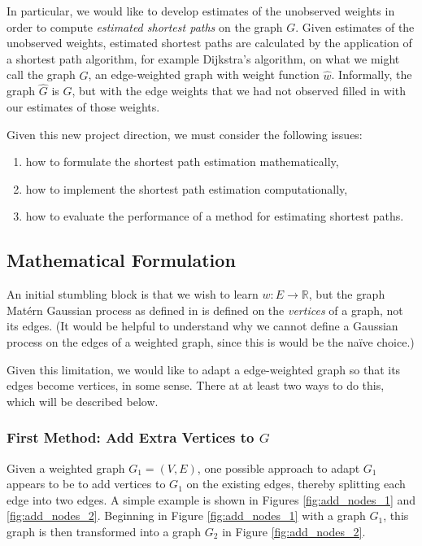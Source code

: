 In particular, we would like to develop estimates of the unobserved weights in order to compute \textit{estimated shortest paths} on the graph $G$. Given estimates of the unobserved weights, estimated shortest paths are calculated by the application of a shortest path algorithm, for example Dijkstra's algorithm, on what we might call the graph $\hat G$, an edge-weighted graph with weight function $\hat w$. Informally, the graph $\hat G$ is $G$, but with the edge weights that we had not observed filled in with our estimates of those weights.

Given this new project direction, we must consider the following issues:

\begin{enumerate}
    \item how to formulate the shortest path estimation mathematically,
    \item how to implement the shortest path estimation computationally,
    \item how to evaluate the performance of a method for estimating shortest paths.
\end{enumerate}

\subsection{Mathematical Formulation}

An initial stumbling block is that we wish to learn $w \colon E \to \mathbb R$, but the graph Mat\'{e}rn Gaussian process as defined in \cite{pmlr-v130-borovitskiy21a} is defined on the \textit{vertices} of a graph, not its edges. (It would be helpful to understand why we cannot define a Gaussian process on the edges of a weighted graph, since this is would be the na\"{i}ve choice.)

Given this limitation, we would like to adapt a edge-weighted graph so that its edges become vertices, in some sense. There at at least two ways to do this, which will be described below.

\subsubsection{First Method: Add Extra Vertices to \texorpdfstring{$G$}{G}}

Given a weighted graph $G_1 = (V, E)$, one possible approach to adapt $G_1$ appears to be to add vertices to $G_1$ on the existing edges, thereby splitting each edge into two edges. A simple example is shown in Figures \ref{fig:add_nodes_1} and \ref{fig:add_nodes_2}. Beginning in Figure \ref{fig:add_nodes_1} with a graph $G_1$, this graph is then transformed into a graph $G_2$ in Figure \ref{fig:add_nodes_2}.

